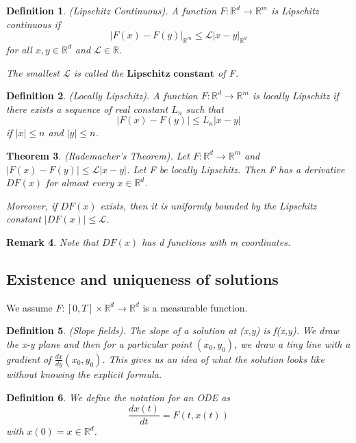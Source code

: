 \documentclass[twoside]{article}
\newcounter{lecnum}
\newtheorem{theorem}{Theorem}[lecnum]
\newtheorem{remark}[theorem]{Remark}
\newtheorem{definition}[theorem]{Definition}
\begin{document}
\begin{definition}(Lipschitz Continuous). A function $F: \mathbb{R}^d \rightarrow \mathbb{R}^m$ is Lipschitz continuous if
$$
|F(x) - F(y)|_{\mathbb{R}^m} \leq \mathcal{L}|x - y|_{\mathbb{R}^d}
$$
for all $x, y \in \mathbb{R}^d$ and $\mathcal{L} \in \mathbb{R}$. 

The smallest $\mathcal{L}$ is called the $\textbf{Lipschitz constant}$ of F.
\end{definition}

\begin{definition}(Locally Lipschitz). A function $F: \mathbb{R}^d \rightarrow \mathbb{R}^m$ is locally Lipschitz if there exists a sequence of real constant $L_n$ such that
$$
|F(x) - F(y)| \leq L_n|x - y|
$$
if $|x| \leq n$ and $|y| \leq n$.
\end{definition}

\begin{theorem}(Rademacher's Theorem). Let $F: \mathbb{R}^d \rightarrow \mathbb{R}^m$ and $|F(x) - F(y)| \leq \mathcal{L}|x-y|$. Let F be locally Lipschitz. Then F has a derivative $DF(x)$ for almost every $x \in \mathbb{R}^d$.

Moreover, if $DF(x)$ exists, then it is uniformly bounded by the Lipschitz constant $|DF(x)| \leq \mathcal{L}$.
\end{theorem}

\begin{remark}Note that $DF(x)$ has d functions with m coordinates.
\end{remark}

\subsection{Existence and uniqueness of solutions}

We assume $F: [0,T] \times \mathbb{R}^d \rightarrow \mathbb{R}^d$ is a measurable function.


\begin{definition}(Slope fields). The slope of a solution at (x,y) is f(x,y). We draw the x-y plane and then for a particular point $(x_0,y_0)$, we draw a tiny line with a gradient of $\frac{dx}{dy}(x_0,y_0)$. This gives us an idea of what the solution looks like without knowing the explicit formula.
\end{definition}

\begin{definition}We define the notation for an ODE as
$$
\frac{dx(t)}{dt} = F(t, x(t))
$$
with $x(0) = x \in \mathbb{R}^d$. 

\end{definition}
\end{document}
